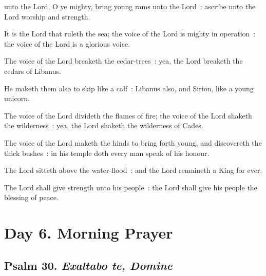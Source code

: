  unto the Lord, O ye mighty, bring young rams unto the Lord~: ascribe unto the Lord worship and strength.\par
{}
It is the Lord that ruleth the sea; the voice of the Lord is mighty in operation~: the voice of the Lord is a glorious voice.\par
{}The voice of the Lord breaketh the cedar-trees~: yea, the Lord breaketh the cedars of Libanus.\par
{}He maketh them also to skip like a calf~: Libanus also, and Sirion, like a young unicorn.\par
{}The voice of the Lord divideth the flames of fire; the voice of the Lord shaketh the wilderness~: yea, the Lord shaketh the wilderness of Cades.\par
{}The voice of the Lord maketh the hinds to bring forth young, and discovereth the thick bushes~: in his temple doth every man speak of his honour.\par
{}The Lord sitteth above the water-flood~: and the Lord remaineth a King for ever.\par
{}The Lord shall give strength unto his people~: the Lord shall give his people the blessing of peace.\par

\section*{Day 6. Morning Prayer}

\subsection{Psalm 30. \textit{Exaltabo te, Domine}}


